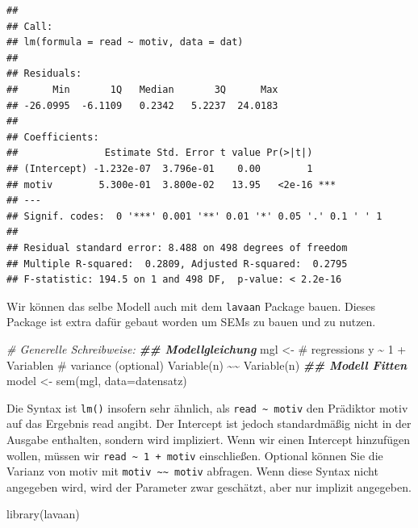 \documentclass[
]{article}
\newenvironment{Shaded}{\begin{snugshade}}{\end{snugshade}}
\newcommand{\AttributeTok}[1]{\textcolor[rgb]{0.77,0.63,0.00}{#1}}
\newcommand{\CommentTok}[1]{\textcolor[rgb]{0.56,0.35,0.01}{\textit{#1}}}
\newcommand{\DocumentationTok}[1]{\textcolor[rgb]{0.56,0.35,0.01}{\textbf{\textit{#1}}}}
\newcommand{\FunctionTok}[1]{\textcolor[rgb]{0.00,0.00,0.00}{#1}}
\newcommand{\NormalTok}[1]{#1}
\newcommand{\OtherTok}[1]{\textcolor[rgb]{0.56,0.35,0.01}{#1}}
\newcommand{\StringTok}[1]{\textcolor[rgb]{0.31,0.60,0.02}{#1}}
\begin{document}
\begin{verbatim}
## 
## Call:
## lm(formula = read ~ motiv, data = dat)
## 
## Residuals:
##      Min       1Q   Median       3Q      Max 
## -26.0995  -6.1109   0.2342   5.2237  24.0183 
## 
## Coefficients:
##               Estimate Std. Error t value Pr(>|t|)    
## (Intercept) -1.232e-07  3.796e-01    0.00        1    
## motiv        5.300e-01  3.800e-02   13.95   <2e-16 ***
## ---
## Signif. codes:  0 '***' 0.001 '**' 0.01 '*' 0.05 '.' 0.1 ' ' 1
## 
## Residual standard error: 8.488 on 498 degrees of freedom
## Multiple R-squared:  0.2809, Adjusted R-squared:  0.2795 
## F-statistic: 194.5 on 1 and 498 DF,  p-value: < 2.2e-16
\end{verbatim}

Wir können das selbe Modell auch mit dem \texttt{lavaan} Package bauen.
Dieses Package ist extra dafür gebaut worden um SEMs zu bauen und zu
nutzen.

\begin{Shaded}
\begin{Highlighting}[]
\CommentTok{\# Generelle Schreibweise:}
\DocumentationTok{\#\# Modellgleichung}
\NormalTok{mgl }\OtherTok{\textless{}{-}} \StringTok{\textquotesingle{}\# regressions}
\StringTok{       y \textasciitilde{} 1 + Variablen}
\StringTok{       \# variance (optional)}
\StringTok{       Variable(n) \textasciitilde{}\textasciitilde{} Variable(n)\textquotesingle{}}
\DocumentationTok{\#\# Modell Fitten}
\NormalTok{model }\OtherTok{\textless{}{-}} \FunctionTok{sem}\NormalTok{(mgl, }\AttributeTok{data=}\NormalTok{datensatz)}
\end{Highlighting}
\end{Shaded}

Die Syntax ist \texttt{lm()} insofern sehr ähnlich, als
\texttt{read\ \textasciitilde{}\ motiv} den Prädiktor motiv auf das
Ergebnis read angibt. Der Intercept ist jedoch standardmäßig nicht in
der Ausgabe enthalten, sondern wird impliziert. Wenn wir einen Intercept
hinzufügen wollen, müssen wir
\texttt{read\ \textasciitilde{}\ 1\ +\ motiv} einschließen. Optional
können Sie die Varianz von motiv mit
\texttt{motiv\ \textasciitilde{}\textasciitilde{}\ motiv} abfragen. Wenn
diese Syntax nicht angegeben wird, wird der Parameter zwar geschätzt,
aber nur implizit angegeben.

\begin{Shaded}
\begin{Highlighting}[]
\FunctionTok{library}\NormalTok{(lavaan)}
\end{Highlighting}
\end{Shaded}
\end{document}
